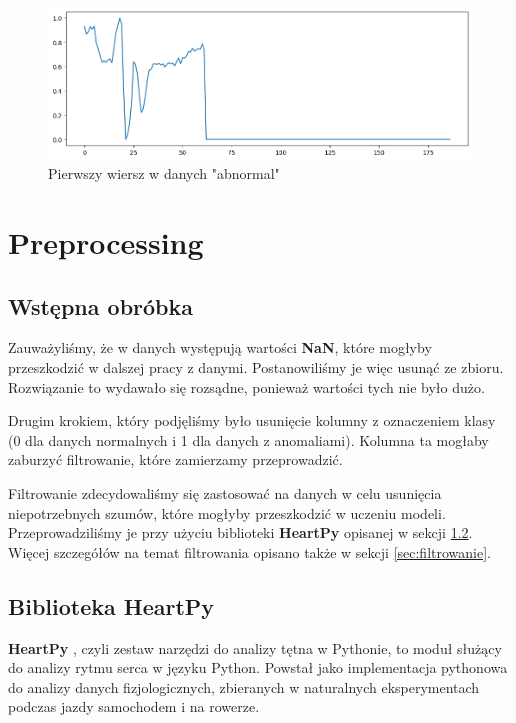 \documentclass[12pt,a4paper]{article}
\begin{document}
\begin{figure}[h]
    \centering
    \includegraphics[width=1\linewidth]{pierwszy_wiersz_abnormal.png}
    \caption{Pierwszy wiersz w danych "abnormal"}
    \label{fig:pierwszy-wiersz-abnormal}
\end{figure}


\section{Preprocessing}
\subsection{Wstępna obróbka}

Zauważyliśmy, że w danych występują wartości \textbf{NaN}, które mogłyby przeszkodzić w dalszej pracy z danymi. Postanowiliśmy je więc usunąć ze zbioru. Rozwiązanie to wydawało się rozsądne, ponieważ wartości tych nie było dużo.

Drugim krokiem, który podjęliśmy było usunięcie kolumny z oznaczeniem klasy (0 dla danych normalnych i 1 dla danych z anomaliami). Kolumna ta mogłaby zaburzyć filtrowanie, które zamierzamy przeprowadzić. 

Filtrowanie zdecydowaliśmy się zastosować na danych w celu usunięcia niepotrzebnych szumów, które mogłyby przeszkodzić w uczeniu modeli. Przeprowadziliśmy je przy użyciu biblioteki \textbf{HeartPy} opisanej w sekcji \ref{sec:heartpy}. Więcej szczegółów na temat filtrowania opisano także w sekcji \ref{sec:filtrowanie}.

\subsection{Biblioteka HeartPy} \label{sec:heartpy}
\textbf{HeartPy} \cite{heartpy-1,heartpy-2}, czyli zestaw narzędzi do analizy tętna w Pythonie, to moduł służący do analizy rytmu serca w języku Python. Powstał jako implementacja pythonowa do analizy danych fizjologicznych, zbieranych w naturalnych eksperymentach podczas jazdy samochodem i na rowerze.
\end{document}
